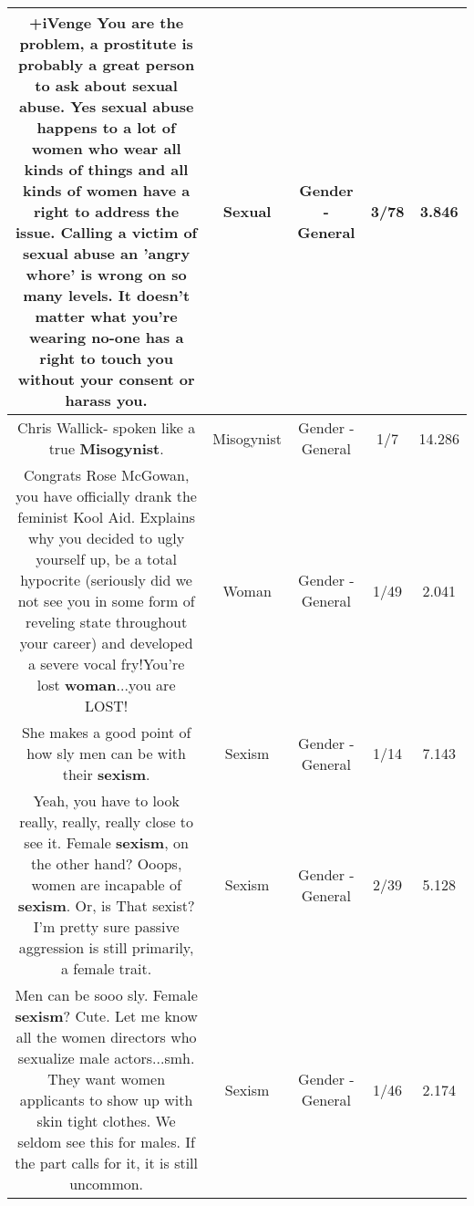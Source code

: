\documentclass[11pt]{article}
\newlength\mylength
\begin{document}
\begin{center}
\begin{longtable}{|C{.65\mylength}|C{.30\mylength}|C{.12\mylength}|C{.12\mylength}|C{.12\mylength}|}
  \small +iVenge You are the problem, a prostitute is probably a great person to ask about \textbf{sexual} abuse. Yes \textbf{sexual} abuse happens to a lot of women who wear all kinds of things and all kinds of women have a right to address the issue. Calling a victim of \textbf{sexual} abuse an 'angry whore' is wrong on so many levels. It doesn't matter what you're wearing no-one has a right to touch you without your consent or harass you.\normalsize   & Sexual & Gender - General & 3/78 & 3.846 \\  \hline
  \small Chris Wallick- spoken like a true \textbf{Misogynist}.\normalsize   & Misogynist & Gender - General & 1/7 & 14.286 \\  \hline
  \small Congrats Rose McGowan, you have officially drank the feminist Kool Aid. Explains why you decided to ugly yourself up, be a total hypocrite (seriously did we not see you in some form of reveling state throughout your career) and developed a severe vocal fry!You're lost \textbf{woman}...you are LOST!\normalsize   & Woman & Gender - General & 1/49 & 2.041 \\  \hline
  \small She makes a good point of how sly men can be with their \textbf{sexism}.\normalsize   & Sexism & Gender - General & 1/14 & 7.143 \\  \hline
  \small Yeah, you have to look really, really, really close to see it. Female \textbf{sexism}, on the other hand?  Ooops, women are incapable of \textbf{sexism}.  Or, is That sexist?I'm pretty sure passive aggression is still primarily, a female trait.\normalsize   & Sexism & Gender - General & 2/39 & 5.128 \\  \hline
  \small Men can be sooo sly. Female \textbf{sexism}? Cute. Let me know all the women directors who sexualize male actors...smh. They want women applicants to show up with skin tight clothes. We seldom see this for males.  If the part calls for it, it is still uncommon.\normalsize   & Sexism & Gender - General & 1/46 & 2.174 \\  \hline

\end{longtable}
\end{center}
\end{document}
